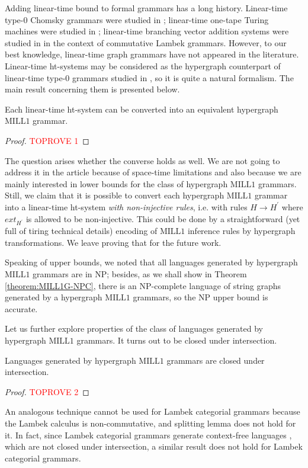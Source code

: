 \documentclass[a4paper,UKenglish,cleveref, autoref, thm-restate,pdfa]{lipics-v2021}
\newcommand{\ext}{\mathit{ext}}
\newcommand{\MILLFO}{\mathrm{MILL}1}
\begin{document}
Adding linear-time bound to formal grammars has a long history. Linear-time type-0 Chomsky grammars were studied in \cite{Book71,Gladkii64}; linear-time one-tape Turing machines were studied in \cite{Tadaki10}; linear-time branching vector addition systems were studied in \cite{Pshenitsyn23} in the context of commutative Lambek grammars. However, to our best knowledge, linear-time graph grammars have not appeared in the literature. Linear-time ht-systems may be considered as the hypergraph counterpart of linear-time type-0 grammars studied in \cite{Book71,Gladkii64}, so it is quite a natural formalism. The main result concerning them is presented below.
\begin{theorem}\label{theorem:MILL1G>LTHTS}
	Each linear-time ht-system can be converted into an equivalent hypergraph $\MILLFO$ grammar.
\end{theorem}
\begin{proof}\textcolor{red}{TOPROVE 1}\end{proof}
The question arises whether the converse holds as well. We are not going to address it in the article because of space-time limitations and also because we are mainly interested in lower bounds for the class of hypergraph $\MILLFO$ grammars. Still, we claim that it is possible to convert each hypergraph $\MILLFO$ grammar into a linear-time ht-system \emph{with non-injective rules}, i.e. with rules $H \to H^\prime$ where $\ext_{H^\prime}$ is allowed to be non-injective. This could be done by a straightforward (yet full of tiring technical details) encoding of $\MILLFO$ inference rules by hypergraph transformations. We leave proving that for the future work.

Speaking of upper bounds, we noted that all languages generated by hypergraph $\MILLFO$ grammars are in NP; besides, as we shall show in Theorem \ref{theorem:MILL1G-NPC}, there is an NP-complete language of string graphs generated by a hypergraph $\MILLFO$ grammars, so the NP upper bound is accurate. 

Let us further explore properties of the class of languages generated by hypergraph $\MILLFO$ grammars. It turns out to be closed under intersection.
\begin{theorem}\label{theorem:hypergraph-MILL1-grammars-intersection}
	Languages generated by hypergraph $\MILLFO$ grammars are closed under intersection.
\end{theorem}
\begin{proof}\textcolor{red}{TOPROVE 2}\end{proof}
An analogous technique cannot be used for Lambek categorial grammars because the Lambek calculus is non-commutative, and splitting lemma does not hold for it. In fact, since Lambek categorial grammars generate context-free languages \cite{Pentus93}, which are not closed under intersection, a similar result does not hold for Lambek categorial grammars.
\end{document}
